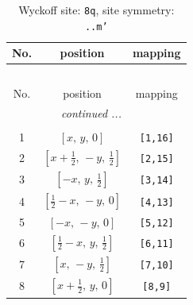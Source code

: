 \documentclass[fleqn,8pt]{jsarticle}
\begin{document}
\begin{longtable}{ccc}
\caption{Wyckoff site: {\tt 8q}, site symmetry: {\tt ..m'}}
 \\
 \hline \hline
No. & position & mapping \\ \hline \endfirsthead

\multicolumn{2}{l}{\tablename\ \thetable{}} \\
 \hline \hline
No. & position & mapping \\ \hline \endhead

 \hline \hline
\multicolumn{2}{r}{\footnotesize\it continued ...} \\ \endfoot

 \hline \hline
\multicolumn{2}{r}{} \\ \endlastfoot

1 & $\left[ x,\, y,\, 0 \right]$ & {\tt [1,16]} \\ \hline
2 & $\left[ x + \frac{1}{2},\, - y,\, \frac{1}{2} \right]$ & {\tt [2,15]} \\ \hline
3 & $\left[ - x,\, y,\, \frac{1}{2} \right]$ & {\tt [3,14]} \\ \hline
4 & $\left[ \frac{1}{2} - x,\, - y,\, 0 \right]$ & {\tt [4,13]} \\ \hline
5 & $\left[ - x,\, - y,\, 0 \right]$ & {\tt [5,12]} \\ \hline
6 & $\left[ \frac{1}{2} - x,\, y,\, \frac{1}{2} \right]$ & {\tt [6,11]} \\ \hline
7 & $\left[ x,\, - y,\, \frac{1}{2} \right]$ & {\tt [7,10]} \\ \hline
8 & $\left[ x + \frac{1}{2},\, y,\, 0 \right]$ & {\tt [8,9]} \\
\end{longtable}
\renewcommand{\arraystretch}{1.2}
\end{document}
